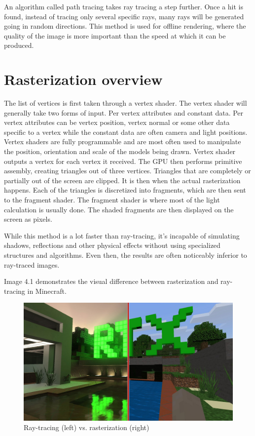 \documentclass[times, utf8, zavrsni, numeric]{fer}
\begin{document}
An algorithm called path tracing takes ray tracing a step further. Once a hit is found, instead of tracing only several specific rays, many rays will be generated going in random directions. This method is used for offline rendering, where the quality of the image is more important than the speed at which it can be produced.

\section{Rasterization overview}
The list of vertices is first taken through a vertex shader. The vertex shader will generally take two forms of input. Per vertex attributes and constant data. Per vertex attributes can be vertex position, vertex normal or some other data specific to a vertex while the constant data are often camera and light positions. Vertex shaders are fully programmable and are most often used to manipulate the position, orientation and scale of the models being drawn. Vertex shader outputs a vertex for each vertex it received. The GPU then performs primitive assembly, creating triangles out of three vertices. Triangles that are completely or partially out of the screen are clipped. It is then when the actual rasterization happens. Each of the triangles is discretized into fragments, which are then sent to the fragment shader. The fragment shader is where most of the light calculation is usually done. The shaded fragments are then displayed on the screen as pixels.

While this method is a lot faster than ray-tracing, it's incapable of simulating shadows, reflections and other physical effects without using specialized structures and algorithms. Even then, the results are often noticeably inferior to ray-traced images.

Image 4.1 demonstrates the visual difference between rasterization and ray-tracing in Minecraft.
\begin{center}
\begin{figure}[H]
\includegraphics[width=1\textwidth]{rtx_vs_ras.jpg}
\caption{Ray-tracing (left) vs. rasterization (right)}
\end{figure}
\label{image:ras_vs_rtx}
\end{center}
\end{document}
